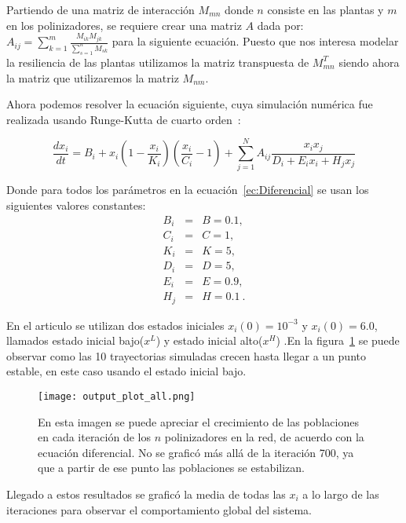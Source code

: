 \documentclass[11pt]{article}
\begin{document}
Partiendo de una matriz de interacción $M_{mn}$ donde $n$ consiste en las plantas y $m$ en los polinizadores, se requiere crear una matriz $A$ dada por: $
A_{ij}=\sum^m_{k=1}\frac{M_{ik}M_{jk}}{\sum^n_{s=1}M_{sk}}
$ para la siguiente ecuación. Puesto que nos interesa modelar la resiliencia de las plantas utilizamos la matriz transpuesta de $M_{mn}^T$ siendo ahora la matriz que utilizaremos la matriz $M_{nm}$.

Ahora podemos resolver la ecuación siguiente, cuya simulación numérica fue realizada usando Runge-Kutta de cuarto orden~\cite{numerical2002recipes}:

\begin{equation}
\label{ec:Diferencial}
\frac{dx_i}{dt} = B_{i}+x_{i}\left( 1-\frac{x_{i}}{K_{i}}\right ) \left(\frac{x_{i}}{C_{i}}-1\right)+\sum^N_{j=1}A_{ij}\frac{x_{i}x_{j}}{D_{i}+E_{i}x_{i}+H_{j}x_{j}}
\end{equation}


Donde para todos los parámetros en la ecuación~\eqref{ec:Diferencial} se usan los siguientes valores constantes:
\begin{eqnarray*}
B_{i}&=&B=0.1,\\
C_{i}&=&C=1,\\
K_{i}&=&K=5,\\ 
D_{i}&=&D=5,\\
E_{i}&=&E=0.9,\\
H_{j}&=&H=0.1\ .
\end{eqnarray*}

En el articulo se utilizan dos estados iniciales $x_{i}(0)=10^{-3}$ y $x_{i}(0)=6.0$, llamados estado inicial bajo($x^{L}$) y estado inicial alto($x^{H}$) .En la figura~\ref{fig-sol-all} se puede observar como las 10 trayectorias simuladas crecen hasta llegar a un punto estable, en este caso usando el estado inicial bajo.

\begin{figure}[H]
\label{fig-sol-all}
\texttt{[image: output\_plot\_all.png]}
\caption{En esta imagen se puede apreciar el crecimiento de las poblaciones en cada iteración de los $n$ polinizadores en la red, de acuerdo con la ecuación diferencial. No se graficó más allá de la iteración 700, ya que a partir de ese punto las poblaciones se estabilizan.}
\end{figure}

Llegado a estos resultados se graficó la media de todas las $x_i$ a lo largo de las iteraciones para observar el comportamiento global del sistema.
\end{document}
